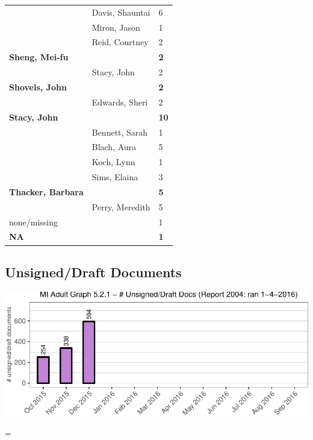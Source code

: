 \documentclass{article}\usepackage[]{graphicx}\usepackage[]{color}
\makeatletter
\def\maxwidth{ %
  \ifdim\Gin@nat@width>\linewidth
    \linewidth
  \else
    \Gin@nat@width
  \fi
}
\newenvironment{knitrout}{}{} %
\newenvironment{absolutelynopagebreak}
  {\par\nobreak\vfil\penalty0\vfilneg
   \vtop\bgroup}
  {\par\xdef\tpd{\the\prevdepth}\egroup
   \prevdepth=\tpd}
\makeatother
\begin{document}
\begin{longtable} { >{\raggedright}p{}|p{}p{}}
   & Davis, Shauntai & 6 \\ 
   & Miron, Jason & 1 \\ 
   & Reid, Courtney & 2 \\ 
   \rowcolor[gray]{0.90}\textbf{Sheng, Mei-fu} &  & \hspace{2cm}\textbf{\textbf{2}} \\ 
   \rowcolor[gray]{0.90} & Stacy, John & 2 \\ 
   \rowcolor[gray]{0.90}\textbf{Shovels, John} &  & \hspace{2cm}\textbf{\textbf{2}} \\ 
   & Edwards, Sheri & 2 \\ 
  \textbf{Stacy, John} &  & \hspace{2cm}\textbf{\textbf{10}} \\ 
   & Bennett, Sarah & 1 \\ 
   \rowcolor[gray]{0.90} & Blach, Aura & 5 \\ 
   \rowcolor[gray]{0.90} & Koch, Lynn & 1 \\ 
   \rowcolor[gray]{0.90} & Sims, Elaina & 3 \\ 
  \textbf{Thacker, Barbara} &  & \hspace{2cm}\textbf{\textbf{5}} \\ 
   & Perry, Meredith & 5 \\ 
  none/missing &  & 1 \\ 
   \rowcolor[gray]{0.90}\textbf{NA} &  & \hspace{2cm}\textbf{\textbf{1}} \\ 
   \end{longtable}


\begin{absolutelynopagebreak}
\subsection{Unsigned/Draft Documents}
\begin{knitrout}
\color{fgcolor}
\includegraphics[width=\maxwidth]{figure/mi_p_unsign-1} 

\end{knitrout}
\end{absolutelynopagebreak}
\end{document}
